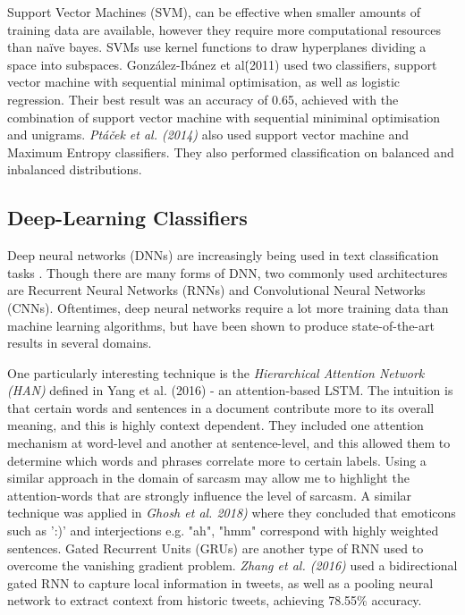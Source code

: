 \documentclass[12pt,a4paper]{article}
\begin{document}
Support Vector Machines (SVM), can be effective when smaller amounts of training data are available, however they require more computational resources than na\"{i}ve bayes. SVMs use kernel functions to draw hyperplanes dividing a space into subspaces. Gonz{\'a}lez-Ib{\'a}nez et al\. (2011) \cite{gonzalez2011identifying} used two classifiers, support vector machine with sequential minimal optimisation, as well as logistic regression. Their best result was an accuracy of 0.65, achieved with the combination of support vector machine with sequential miniminal optimisation and unigrams. \textit{Pt{\'a}{\v{c}ek et al. (2014)}} \cite{ptavcek2014sarcasm} also used support vector machine and Maximum Entropy classifiers. They also performed classification on balanced and inbalanced distributions.

\subsection{Deep-Learning Classifiers}\vspace{-10pt}
Deep neural networks (DNNs) are increasingly being used in text classification tasks \cite{zhang2015character, poria2016deeper}. Though there are many forms of DNN, two commonly used architectures are Recurrent Neural Networks (RNNs) and Convolutional Neural Networks (CNNs). Oftentimes, deep neural networks require a lot more training data than machine learning algorithms, but have been shown to produce state-of-the-art results in several domains.




One particularly interesting technique is the \textit{Hierarchical Attention Network (HAN)} defined in Yang et al. (2016) \cite{yang2016hierarchical} - an attention-based LSTM. The intuition is that certain words and sentences in a document contribute more to its overall meaning, and this is highly context dependent. They included one attention mechanism at word-level and another at sentence-level, and this allowed them to determine which words and phrases correlate more to certain labels. Using a similar approach in the domain of sarcasm may allow me to highlight the attention-words that are strongly influence the level of sarcasm. A similar technique was applied in \textit{Ghosh et al. 2018)} \cite{ghosh2018sarcasm} where they concluded that emoticons such as ':)' and interjections e.g. "ah", "hmm" correspond with highly weighted sentences. Gated Recurrent Units (GRUs) are another type of RNN used to overcome the vanishing gradient problem.  \textit{Zhang et al. (2016)} \cite{zhang2016tweet} used a bidirectional gated RNN to capture local information in tweets, as well as a pooling neural network to extract context from historic tweets, achieving 78.55\% accuracy.
\end{document}
